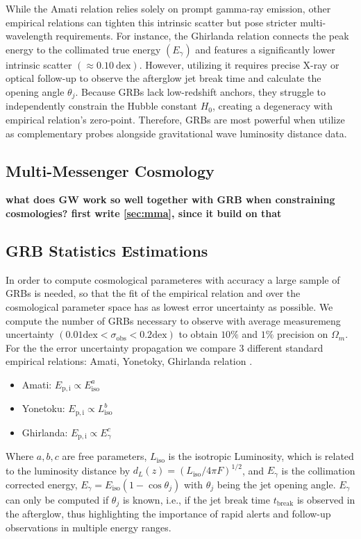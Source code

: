 \documentclass[
    aps,
    prd,
    twocolumn,
    nofootinbib,
    floatfix,
    superscriptaddress,
]{revtex4-2}
\begin{document}
While the Amati relation relies solely on prompt gamma-ray emission, other empirical relations can tighten this intrinsic scatter but pose stricter multi-wavelength requirements. For instance, the Ghirlanda relation connects the peak energy to the collimated true energy $(E_\gamma)$ and features a significantly lower intrinsic scatter $(\approx 0.10 \ \mathrm{dex})$. However, utilizing it requires precise X-ray or optical follow-up to observe the afterglow jet break time and calculate the opening angle $\theta_j$. Because GRBs lack low-redshift anchors, they struggle to independently constrain the Hubble constant $H_0$, creating a degeneracy with empirical relation's zero-point. Therefore, GRBs are most powerful when utilize as complementary probes alongside gravitational wave luminosity distance data.

\subsection{Multi-Messenger Cosmology}

\textbf{what does GW work so well together with GRB when constraining cosmologies? first write \ref{sec:mma}, since it build on that}

\subsection{GRB Statistics Estimations}

In order to compute cosmological parameteres with accuracy a large sample of GRBs is needed, so that the fit of the empirical relation and over the cosmological parameter space has as lowest error uncertainty as possible. We compute the number of GRBs necessary to observe with average measuremeng uncertainty $(0.01 \mathrm{dex}< \sigma_\mathrm{obs} < 0.2 \mathrm{dex})$ to obtain $10\%$ and $1\%$ precision on $\Omega_m$. For the the error uncertainty propagation we compare 3 different standard empirical relations: Amati, Yonetoky, Ghirlanda relation \citep{ghirlanda200X}.

\begin{itemize}
	\item Amati: $E_\mathrm{p, i} \propto E_\mathrm{iso}^a$
	\item Yonetoku: $E_\mathrm{p, i} \propto L_\mathrm{iso}^b$
	\item Ghirlanda: $E_\mathrm{p, i} \propto E_\gamma ^c$
\end{itemize}

Where $a,b,c$ are free parameters, $L_\mathrm{iso}$ is the isotropic Luminosity, which is related to the luminosity distance by $d_L (z) = (L_\mathrm{iso} / 4\pi F)^{1/2}$, and $E_\gamma$ is the collimation corrected energy, $E_\gamma = E_\mathrm{iso} (1-\cos \theta_j)$ with $\theta_j$ being the jet opening angle. $E_\gamma$ can only be computed if $\theta_j$ is known, i.e., if the jet break time $t_\mathrm{break}$ is observed in the afterglow, thus highlighting the importance of rapid alerts and follow-up observations in multiple energy ranges.
\end{document}
